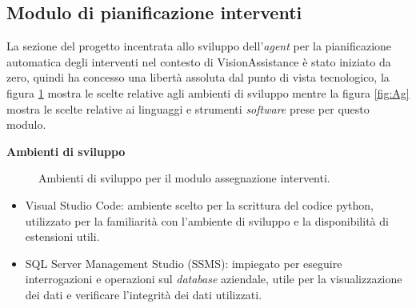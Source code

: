 \subsection{Modulo di pianificazione interventi }
La sezione del progetto incentrata allo sviluppo dell'\textit{agent} per la pianificazione automatica degli interventi nel contesto di VisionAssistance è stato iniziato da zero, quindi ha concesso una libertà assoluta dal punto di vista tecnologico, la figura \ref{img:sviluppoa} mostra le scelte relative agli ambienti di sviluppo mentre la figura \ref{fig:Ag} mostra le scelte relative ai linguaggi e strumenti \textit{software} prese per questo modulo.

\textbf{Ambienti di sviluppo}
\begin{figure}[H]
\centering
{}
\caption{Ambienti di sviluppo  per il modulo assegnazione interventi.}
\label{img:sviluppoa}
\end{figure}

\begin{itemize}
    \item Visual Studio Code: ambiente scelto per la scrittura del codice python, utilizzato per la familiarità con l'ambiente di sviluppo e la disponibilità di estensioni utili.
    \item SQL Server Management Studio (SSMS): impiegato per eseguire interrogazioni e operazioni sul \textit{database} aziendale, utile per la visualizzazione dei dati e verificare l'integrità dei dati utilizzati.

\end{itemize}

